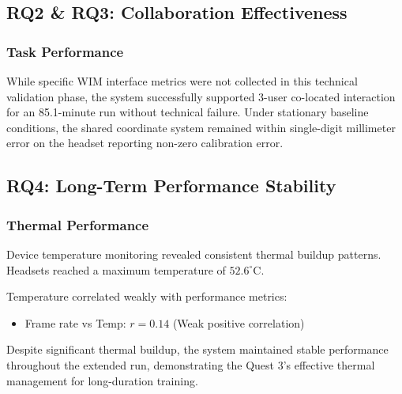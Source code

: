 \subsection{RQ2 \& RQ3: Collaboration Effectiveness}

\subsubsection{Task Performance}

While specific WIM interface metrics were not collected in this technical validation phase, the system successfully supported 3-user co-located interaction for an 85.1-minute run without technical failure. Under stationary baseline conditions, the shared coordinate system remained within single-digit millimeter error on the headset reporting non-zero calibration error.

\subsection{RQ4: Long-Term Performance Stability}

\subsubsection{Thermal Performance}

Device temperature monitoring revealed consistent thermal buildup patterns. Headsets reached a maximum temperature of $52.6^{\circ}$C.

Temperature correlated weakly with performance metrics:
\begin{itemize}
    \item Frame rate vs Temp: $r=0.14$ (Weak positive correlation)
\end{itemize}

Despite significant thermal buildup, the system maintained stable performance throughout the extended run, demonstrating the Quest 3's effective thermal management for long-duration training.
